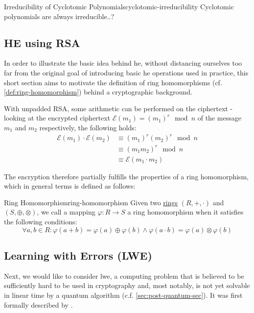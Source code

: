 \begin{remark}{Irreducibility of Cyclotomic Polynomials}{cyclotomic-irreducibility}
  Cyclotomic polynomials are always irreducible..?
\end{remark}

\subsection{HE using RSA}
In order to illustrate the basic idea behind \Gls{he}, without distancing ourselves too far
from the original goal of introducing basic \gls{he} operations used in practice, this short section aims to motivate
the definition of ring homomorphisms (cf. \autoref{def:ring-homomorphism}) behind a cryptographic background.

With unpadded RSA, some arithmetic can be performed on the ciphertext - %
looking at the encrypted ciphertext $\mathcal{E}(m_1) = (m_1)^r \mod n$
of the message $m_1$ and $m_2$ respectively, the following holds:
\begin{align*}
  \mathcal{E}(m_1) \cdot \mathcal{E}(m_2)
   & \equiv (m_1)^r (m_2)^r \mod n     \\
   & \equiv (m_1 m_2)^r \mod n         \\
   & \equiv \mathcal{E}(m_1 \cdot m_2)
\end{align*}

The encryption therefore partially fulfills the properties of a ring homomorphism,
which in general terms is defined as follows:

\begin{definition}{Ring Homomorphism}{ring-homomorphism}
  Given two \hyperref[def:ring]{rings} $(R, +, \cdot)$ and $(S, \oplus, \otimes)$, we call a mapping $\varphi: R \rightarrow S$
  a ring homomorphism when it satisfies the following conditions:
  $$\forall a, b \in R: \varphi(a + b) = \varphi(a) \oplus \varphi(b) \wedge \varphi(a \cdot b) =
    \varphi(a) \otimes \varphi(b)$$
\end{definition}

\subsection{Learning with Errors (LWE)}
Next, we would like to consider \Gls{lwe}, a computing problem that is believed to be sufficiently hard
to be used in cryptography and, most notably, is not yet solvable in linear time by a quantum algorithm
(c.f. \autoref{sec:post-quantum-sec}).
It was first formally described by \textcite{2005-lwe-original}.

